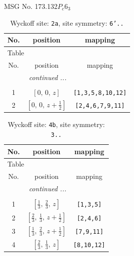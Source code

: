 \documentclass[fleqn,8pt]{jsarticle}
\begin{document}
\setcounter{MaxMatrixCols}{32}

\renewcommand{\tablename}{Table~}
\renewcommand{\figurename}{Figure~}
\begin{center}
\LARGE
MSG No. 173.132\quad$P_{c}6_{3}$
\end{center}
\renewcommand{\arraystretch}{1.2}
\begin{longtable}{ccc}
\caption{Wyckoff site: {\tt 2a}, site symmetry: {\tt 6'..}}
 \\
 \hline \hline
No. & position & mapping \\ \hline \endfirsthead

\multicolumn{2}{l}{\tablename\ \thetable{}} \\
 \hline \hline
No. & position & mapping \\ \hline \endhead

 \hline \hline
\multicolumn{2}{r}{\footnotesize\it continued ...} \\ \endfoot

 \hline \hline
\multicolumn{2}{r}{} \\ \endlastfoot

1 & $\left[ 0,\, 0,\, z \right]$ & {\tt [1,3,5,8,10,12]} \\ \hline
2 & $\left[ 0,\, 0,\, z + \frac{1}{2} \right]$ & {\tt [2,4,6,7,9,11]} \\
\end{longtable}
\renewcommand{\arraystretch}{1.2}
\begin{longtable}{ccc}
\caption{Wyckoff site: {\tt 4b}, site symmetry: {\tt 3..}}
 \\
 \hline \hline
No. & position & mapping \\ \hline \endfirsthead

\multicolumn{2}{l}{\tablename\ \thetable{}} \\
 \hline \hline
No. & position & mapping \\ \hline \endhead

 \hline \hline
\multicolumn{2}{r}{\footnotesize\it continued ...} \\ \endfoot

 \hline \hline
\multicolumn{2}{r}{} \\ \endlastfoot

1 & $\left[ \frac{1}{3},\, \frac{2}{3},\, z \right]$ & {\tt [1,3,5]} \\ \hline
2 & $\left[ \frac{2}{3},\, \frac{1}{3},\, z + \frac{1}{2} \right]$ & {\tt [2,4,6]} \\ \hline
3 & $\left[ \frac{1}{3},\, \frac{2}{3},\, z + \frac{1}{2} \right]$ & {\tt [7,9,11]} \\ \hline
4 & $\left[ \frac{2}{3},\, \frac{1}{3},\, z \right]$ & {\tt [8,10,12]} \\
\end{longtable}
\end{document}

